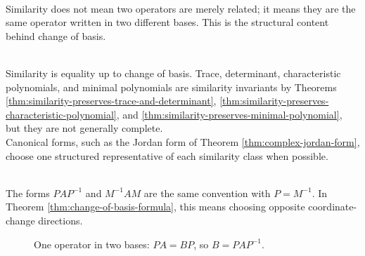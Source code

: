 \begin{perspective} \\
Similarity does not mean two operators are merely related; it means they are the same operator written in two different bases. This is the structural content behind change of basis.
\end{perspective}

\begin{perspective} \label{per:similarity-invariants-and-canonical-forms} \\
Similarity is equality up to change of basis. Trace, determinant, characteristic polynomials, and minimal polynomials are similarity invariants by Theorems \ref{thm:similarity-preserves-trace-and-determinant}, \ref{thm:similarity-preserves-characteristic-polynomial}, and \ref{thm:similarity-preserves-minimal-polynomial}, but they are not generally complete.\\
Canonical forms, such as the Jordan form of Theorem \ref{thm:complex-jordan-form}, choose one structured representative of each similarity class when possible.
\end{perspective}

\begin{remark} \label{rem:similarity-convention} \\
The forms $PAP^{-1}$ and $M^{-1}AM$ are the same convention with $P=M^{-1}$. In Theorem \ref{thm:change-of-basis-formula}, this means choosing opposite coordinate-change directions.
\end{remark}

\begin{figure}[H]
  \centering
  
  \caption{One operator in two bases: $PA=BP$, so $B=PAP^{-1}$.}
  \label{fig:similarity-change-of-basis-bridge}
\end{figure}

